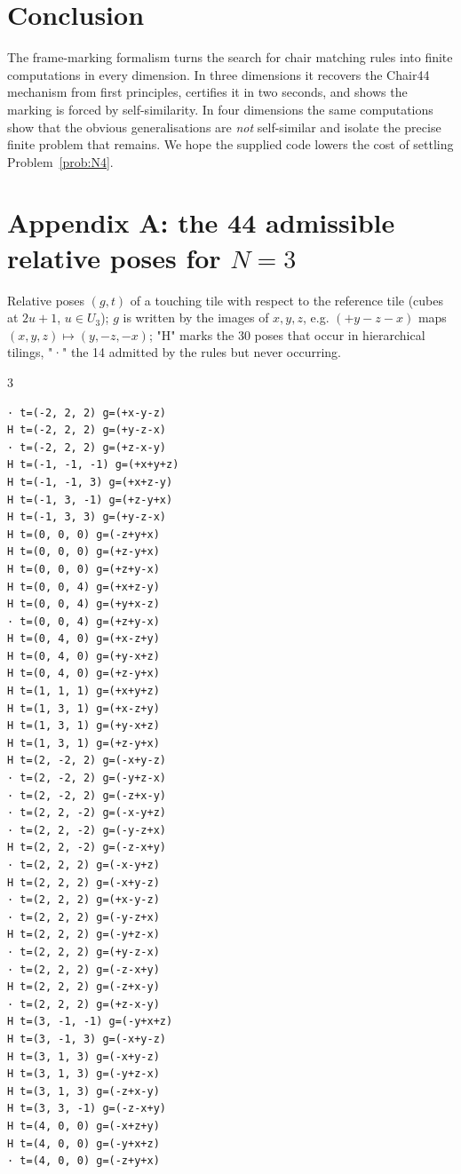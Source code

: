 \documentclass[11pt,a4paper]{article}
\theoremstyle{plain}
\theoremstyle{definition}
\begin{document}
\section{Conclusion}

The frame-marking formalism turns the search for chair matching rules into finite computations in every dimension. In three dimensions it recovers the Chair44 mechanism from first principles, certifies it in two seconds, and shows the marking is forced by self-similarity. In four dimensions the same computations show that the obvious generalisations are \emph{not} self-similar and isolate the precise finite problem that remains. We hope the supplied code lowers the cost of settling Problem~\ref{prob:N4}.




\section*{Appendix A: the 44 admissible relative poses for $N = 3$}

Relative poses $(g, t)$ of a touching tile with respect to the reference tile (cubes at $2u + 1$, $u \in U_3$); $g$ is written by the images of $x, y, z$, e.g. $(+y -z -x)$ maps $(x,y,z) \mapsto (y, -z, -x)$; "H" marks the 30 poses that occur in hierarchical tilings, "·" the 14 admitted by the rules but never occurring.

\begin{multicols}{3}\scriptsize\begin{verbatim}
· t=(-2, 2, 2) g=(+x-y-z)
H t=(-2, 2, 2) g=(+y-z-x)
· t=(-2, 2, 2) g=(+z-x-y)
H t=(-1, -1, -1) g=(+x+y+z)
H t=(-1, -1, 3) g=(+x+z-y)
H t=(-1, 3, -1) g=(+z-y+x)
H t=(-1, 3, 3) g=(+y-z-x)
H t=(0, 0, 0) g=(-z+y+x)
H t=(0, 0, 0) g=(+z-y+x)
H t=(0, 0, 0) g=(+z+y-x)
H t=(0, 0, 4) g=(+x+z-y)
H t=(0, 0, 4) g=(+y+x-z)
· t=(0, 0, 4) g=(+z+y-x)
H t=(0, 4, 0) g=(+x-z+y)
H t=(0, 4, 0) g=(+y-x+z)
H t=(0, 4, 0) g=(+z-y+x)
H t=(1, 1, 1) g=(+x+y+z)
H t=(1, 3, 1) g=(+x-z+y)
H t=(1, 3, 1) g=(+y-x+z)
H t=(1, 3, 1) g=(+z-y+x)
H t=(2, -2, 2) g=(-x+y-z)
· t=(2, -2, 2) g=(-y+z-x)
· t=(2, -2, 2) g=(-z+x-y)
· t=(2, 2, -2) g=(-x-y+z)
· t=(2, 2, -2) g=(-y-z+x)
H t=(2, 2, -2) g=(-z-x+y)
· t=(2, 2, 2) g=(-x-y+z)
H t=(2, 2, 2) g=(-x+y-z)
· t=(2, 2, 2) g=(+x-y-z)
· t=(2, 2, 2) g=(-y-z+x)
H t=(2, 2, 2) g=(-y+z-x)
· t=(2, 2, 2) g=(+y-z-x)
· t=(2, 2, 2) g=(-z-x+y)
H t=(2, 2, 2) g=(-z+x-y)
· t=(2, 2, 2) g=(+z-x-y)
H t=(3, -1, -1) g=(-y+x+z)
H t=(3, -1, 3) g=(-x+y-z)
H t=(3, 1, 3) g=(-x+y-z)
H t=(3, 1, 3) g=(-y+z-x)
H t=(3, 1, 3) g=(-z+x-y)
H t=(3, 3, -1) g=(-z-x+y)
H t=(4, 0, 0) g=(-x+z+y)
H t=(4, 0, 0) g=(-y+x+z)
· t=(4, 0, 0) g=(-z+y+x)
\end{verbatim}\end{multicols}
\end{document}
